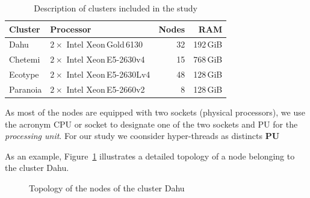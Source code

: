 \begin{table}[!hbt]
    \centering
    \caption{Description of clusters included in the study}
    \label{table:g5k}
    \small
    \begin{tabular}{|l|l|r|r|}
        \hline
        \textbf{Cluster}  & \textbf{Processor}               & \textbf{Nodes} & \textbf{RAM} \\
        \hline
        \hline
        \textsf{Dahu}     & $2\times$ Intel Xeon\,Gold\,6130 & 32             & 192\,GiB     \\
        \hline
        \textsf{Chetemi}  & $2\times$ Intel Xeon\,E5-2630v4  & 15             & 768\,GiB     \\
        \hline
        \textsf{Ecotype}  & $2\times$ Intel Xeon\,E5-2630Lv4 & 48             & 128\,GiB     \\
        \hline
        \textsf{Paranoia} & $2\times$ Intel Xeon\,E5-2660v2  & 8              & 128\,GiB     \\
        \hline
    \end{tabular}
\end{table}

As most of the nodes are equipped with two sockets (physical processors), we use the acronym \textsf{CPU} or \textsf{socket} to designate one of the two sockets and \textsf{PU} for the \emph{processing unit}. For our study we coonsider hyper-threads as distincts \textbf{PU}

As an example, Figure~\ref{fig:topo} illustrates a detailed topology of a node belonging to the cluster \textsf{Dahu}.

\begin{figure}%
    \caption{Topology of the nodes of the cluster \textsf{Dahu}}\label{fig:topo}
\end{figure}

